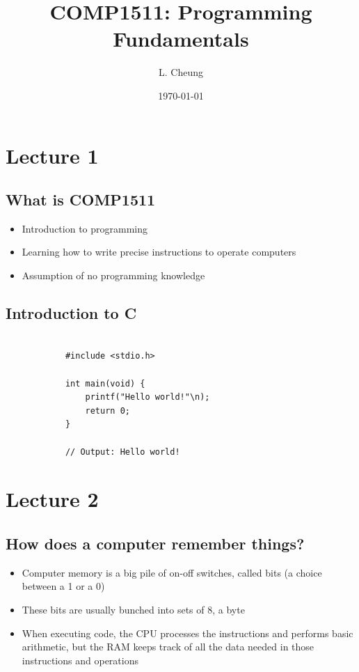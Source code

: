 \documentclass{article}
\title{\textbf{COMP1511: Programming Fundamentals}}
\author{L. Cheung}
\date{\today}
\begin{document}
\maketitle
\tableofcontents
\newpage

\section{Lecture 1}
	\subsection{What is COMP1511}
		\begin{itemize}
			\item Introduction to programming
			\item Learning how to write precise instructions to operate computers
			\item Assumption of no programming knowledge
		\end{itemize}

	\subsection{Introduction to C}
		\begin{verbatim}

			#include <stdio.h>

			int main(void) {
				printf("Hello world!"\n);
				return 0;
			}

			// Output: Hello world!
		\end{verbatim}

\newpage

\section{Lecture 2}
	\subsection{How does a computer remember things?}
		\begin{itemize}
			\item Computer memory is a big pile of on-off switches, called bits (a choice between a 1 or a 0)
			\item These bits are usually bunched into sets of 8, a byte
			\item When executing code, the CPU processes the instructions and performs basic arithmetic, but the RAM keeps track of all the data needed in those instructions and operations
		\end{itemize}
\end{document}
